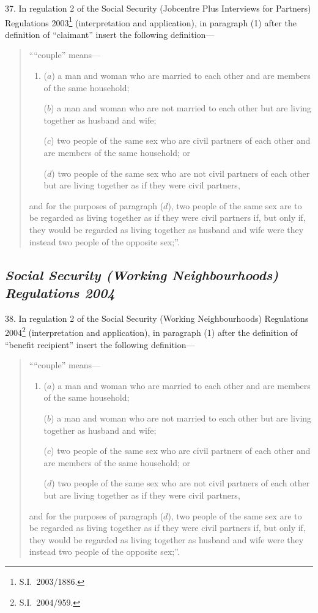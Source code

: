 \documentclass[12pt,a4paper]{article}
\begin{document}
37.  In regulation 2 of the Social Security (Jobcentre Plus Interviews for Partners) Regulations 2003\footnote{S.I.\ 2003/1886.} (interpretation and application), in paragraph (1) after the definition of “claimant” insert the following definition—
\begin{quotation}
““couple” means—
\begin{enumerate}\item[]
($a$) 
a man and woman who are married to each other and are members of the same household;

($b$) 
a man and woman who are not married to each other but are living together as husband and wife;

($c$) 
two people of the same sex who are civil partners of each other and are members of the same household; or

($d$) 
two people of the same sex who are not civil partners of each other but are living together as if they were civil partners,
\end{enumerate}
and for the purposes of paragraph ($d$), two people of the same sex are to be regarded as living together as if they were civil partners if, but only if, they would be regarded as living together as husband and wife were they instead two people of the opposite sex;”.
\end{quotation}

\subsection*{\itshape Social Security (Working Neighbourhoods) Regulations 2004}

38.  In regulation 2 of the Social Security (Working Neighbourhoods) Regulations 2004\footnote{S.I.\ 2004/959.} (interpretation and application), in paragraph (1) after the definition of “benefit recipient” insert the following definition—
\begin{quotation}
““couple” means—
\begin{enumerate}\item[]
($a$) 
a man and woman who are married to each other and are members of the same household;

($b$) 
a man and woman who are not married to each other but are living together as husband and wife;

($c$) 
two people of the same sex who are civil partners of each other and are members of the same household; or

($d$) 
two people of the same sex who are not civil partners of each other but are living together as if they were civil partners,
\end{enumerate}
and for the purposes of paragraph ($d$), two people of the same sex are to be regarded as living together as if they were civil partners if, but only if, they would be regarded as living together as husband and wife were they instead two people of the opposite sex;”.
\end{quotation}
\end{document}
